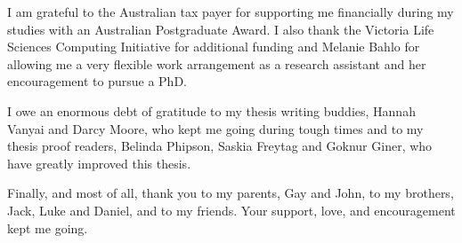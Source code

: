 \documentclass[11pt,a4paper,oneside]{book}	%
\begin{document}
I am grateful to the Australian tax payer for supporting me financially during my studies with an Australian Postgraduate Award. I also thank the Victoria Life Sciences Computing Initiative for additional funding and Melanie Bahlo for allowing me a very flexible work arrangement as a research assistant and her encouragement to pursue a PhD.

I owe an enormous debt of gratitude to my thesis writing buddies, Hannah Vanyai and Darcy Moore, who kept me going during tough times and to my thesis proof readers, Belinda Phipson, Saskia Freytag and Goknur Giner, who have greatly improved this thesis.

Finally, and most of all, thank you to my parents, Gay and John, to my brothers, Jack, Luke and Daniel, and to my friends. Your support, love, and encouragement kept me going.

\tableofcontents

\listoffigures

\listoftables

\mainmatter











\backmatter



\end{document}
